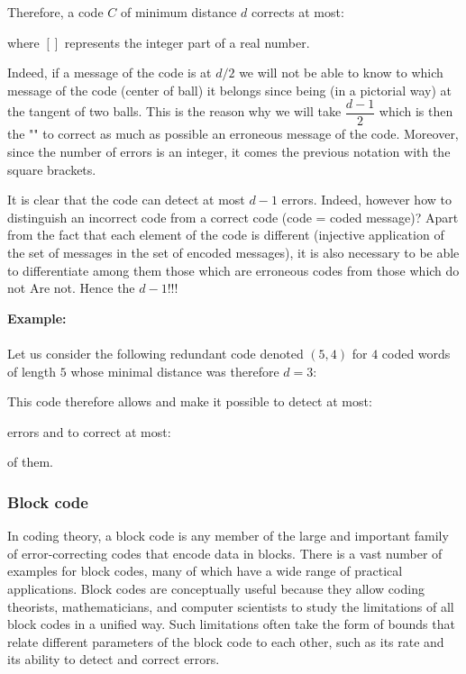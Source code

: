 	Therefore, a code $C$ of minimum distance $d$ corrects at most:
	
	where $[]$ represents the integer part of a real number.

	Indeed, if a message of the code is at $d/2$ we will not be able to know to which message of the code (center of ball) it belongs since being (in a pictorial way) at the tangent of two balls. This is the reason why we will take $\dfrac{d-1}{2}$ which is then the "" to correct as much as possible an erroneous message of the code. Moreover, since the number of errors is an integer, it comes the previous notation with the square brackets.
	
	It is clear that the code can detect at most $d-1$ errors. Indeed, however how to distinguish an incorrect code from a correct code (code = coded message)? Apart from the fact that each element of the code is different (injective application of the set of messages in the set of encoded messages), it is also necessary to be able to differentiate among them those which are erroneous codes from those which do not Are not. Hence the $d-1$!!!
	\begin{tcolorbox}[colframe=black,colback=white,sharp corners]
	\textbf{{\Large {}}Example:}\\\\
	Let us consider the following redundant code denoted $(5, 4)$ for $4$ coded words of length $5$ whose minimal distance was therefore $d=3$:
	
	This code therefore allows and make it possible to detect at most:
	
	errors and to correct at most:
	
	of them.
	\end{tcolorbox}
	
	\subsubsection{Block code}
	In coding theory, a block code is any member of the large and important family of error-correcting codes that encode data in blocks. There is a vast number of examples for block codes, many of which have a wide range of practical applications. Block codes are conceptually useful because they allow coding theorists, mathematicians, and computer scientists to study the limitations of all block codes in a unified way. Such limitations often take the form of bounds that relate different parameters of the block code to each other, such as its rate and its ability to detect and correct errors.

